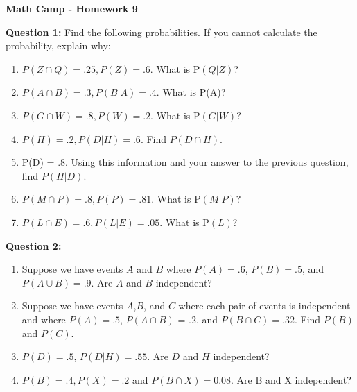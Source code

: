 \documentclass[10pt]{amsart}
\begin{document}
\centerline{\bf Math Camp - Homework 9}


\noindent \textbf{Question 1:}
 Find the following probabilities. If you cannot calculate the probability, explain why:

\begin{enumerate} 
\item $P(Z \cap Q) = .25, P(Z) = .6$. What is P$(Q | Z)$?
\item $P(A \cap B) = .3, P(B|A) = .4$. What is P(A)?
\item $P(G \cap W) = .8, P(W) = .2$. What is P$(G | W)$?
\item $P(H) = .2, P(D | H) = .6$. Find $P(D \cap H).$
\item P(D) = .8. Using  this information and your answer to the previous question, find $P(H | D)$. 
\item $P(M \cap P) = .8, P(P) = .81$. What is P$(M | P)$?
\item  $P(L \cap E) = .6, P(L | E) = .05$. What is P$(L)$?
\end{enumerate}

\bigskip

\noindent \textbf{Question 2:} 

\begin{enumerate}
\item Suppose we have events $A$ and $B$ where $P(A)=.6$, $P(B)=.5$, and $P(A \cup B)=.9$. Are $A$ and $B$ independent?
\item Suppose we have events $A$,$B$, and $C$ where each pair of events is independent and where $P(A) =.5$, $P(A \cap B)$ = .2, and $P(B \cap C) = .32$. Find $P(B)$ and $P(C)$.
\item $P(D) = .5$, $P(D|H) = .55$. Are $D$ and $H$ independent?
\item $P(B) = .4, P(X) = .2$ and $P(B \cap X) = 0.08$. Are B and X independent?
\end{enumerate}

\bigskip
\end{document}
